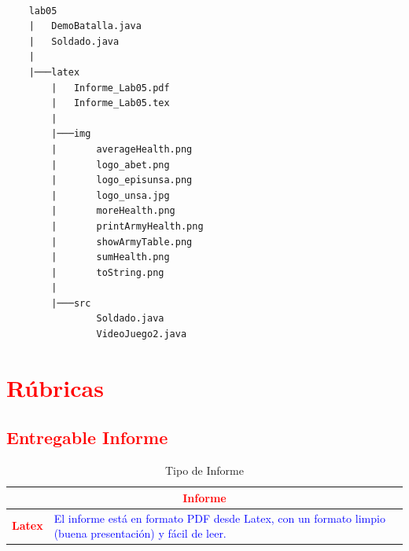 \documentclass{article}
\begin{document}
\begin{lstlisting}[style=ascii-tree]

    lab05
    |   DemoBatalla.java
    |   Soldado.java
    |
    |───latex
        |   Informe_Lab05.pdf
        |   Informe_Lab05.tex
        |
        |───img
        |       averageHealth.png
        |       logo_abet.png
        |       logo_episunsa.png
        |       logo_unsa.jpg
        |       moreHealth.png
        |       printArmyHealth.png
        |       showArmyTable.png
        |       sumHealth.png
        |       toString.png
        |
        |───src
                Soldado.java
                VideoJuego2.java

\end{lstlisting}    

	\section{\textcolor{red}{Rúbricas}}
	
	\subsection{\textcolor{red}{Entregable Informe}}
	\begin{table}[H]
		\caption{Tipo de Informe}
		\setlength{\tabcolsep}{0.5em} %
		{\renewcommand{\arraystretch}{1.5} %
		\begin{tabular}{|p{3cm}|p{12cm}|}
			\hline
			\multicolumn{2}{|c|}{\textbf{\textcolor{red}{Informe}}}  \\
			\hline 
			\textbf{\textcolor{red}{Latex}} & \textcolor{blue}{El informe está en formato PDF desde Latex,  con un formato limpio (buena presentación) y fácil de leer.}   \\ 
			\hline 
			
			
		\end{tabular}
	}
	\end{table}
	
	\clearpage
 
\end{document}
